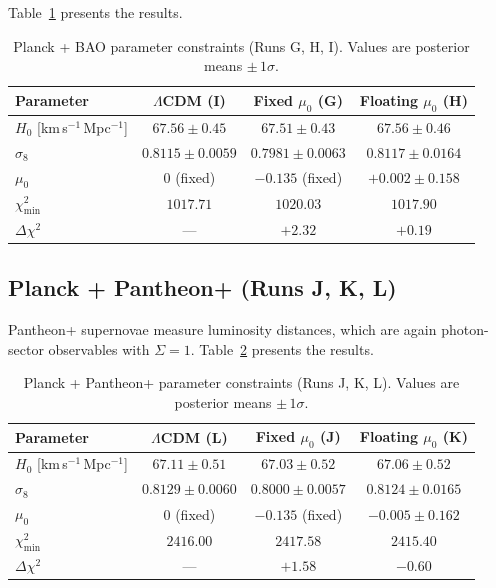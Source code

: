 \documentclass[11pt]{article}
\begin{document}
Table~\ref{tab:planck_bao} presents the results.

\begin{table}[H]
\centering
\caption{Planck + BAO parameter constraints (Runs G, H, I). Values are posterior means $\pm\,1\sigma$.}
\label{tab:planck_bao}
\begin{tabular}{lccc}
\toprule
Parameter & $\Lambda$CDM (I) & Fixed $\mu_0$ (G) & Floating $\mu_0$ (H) \\
\midrule
$H_0$ [km\,s$^{-1}$\,Mpc$^{-1}$] & $67.56 \pm 0.45$ & $67.51 \pm 0.43$ & $67.56 \pm 0.46$ \\
$\sigma_8$                          & $0.8115 \pm 0.0059$ & $0.7981 \pm 0.0063$ & $0.8117 \pm 0.0164$ \\
$\mu_0$                             & $0$ (fixed)               & $-0.135$ (fixed)          & $+0.002 \pm 0.158$ \\
\midrule
$\chi^2_\mathrm{min}$               & $1017.71$ & $1020.03$ & $1017.90$ \\
$\Delta\chi^2$                      & ---         & $+2.32$ & $+0.19$ \\
\bottomrule
\end{tabular}
\end{table}


\subsection{Planck + Pantheon+ (Runs J, K, L)}
\label{sec:planck_sne}

Pantheon+ supernovae measure luminosity distances, which are again photon-sector observables with $\Sigma = 1$.
Table~\ref{tab:planck_sne} presents the results.

\begin{table}[H]
\centering
\caption{Planck + Pantheon+ parameter constraints (Runs J, K, L). Values are posterior means $\pm\,1\sigma$.}
\label{tab:planck_sne}
\begin{tabular}{lccc}
\toprule
Parameter & $\Lambda$CDM (L) & Fixed $\mu_0$ (J) & Floating $\mu_0$ (K) \\
\midrule
$H_0$ [km\,s$^{-1}$\,Mpc$^{-1}$] & $67.11 \pm 0.51$ & $67.03 \pm 0.52$ & $67.06 \pm 0.52$ \\
$\sigma_8$                          & $0.8129 \pm 0.0060$ & $0.8000 \pm 0.0057$ & $0.8124 \pm 0.0165$ \\
$\mu_0$                             & $0$ (fixed)               & $-0.135$ (fixed)          & $-0.005 \pm 0.162$ \\
\midrule
$\chi^2_\mathrm{min}$               & $2416.00$ & $2417.58$ & $2415.40$ \\
$\Delta\chi^2$                      & ---         & $+1.58$ & $-0.60$ \\
\bottomrule
\end{tabular}
\end{table}
\end{document}
